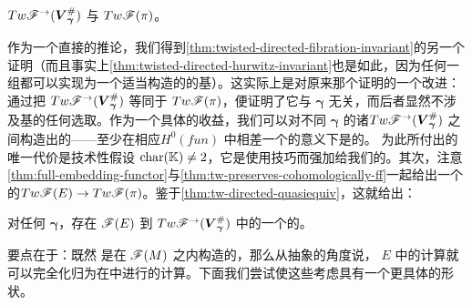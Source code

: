 \begin{theorem}\label{thm:tw-directed-quasiequiv}
$Tw\mathscr{F}^{\rightarrow}(\boldsymbol{V}^{\#}_{\boldsymbol{\gamma}})$ 与 $Tw\mathscr{F}(\pi)$\trQuasiequivalent{}。
\end{theorem}
\noqed
作为一个直接的推论，我们得到\cref{thm:twisted-directed-fibration-invariant}的另一个证明（而且事实上\cref{thm:twisted-directed-hurwitz-invariant}也是如此，因为任何一组\trLagrange\trSphere{}都可以实现为一个适当构造的\trLefschetzFibration{}的\trVanishingCycle{}基）。这实际上是对原来那个证明的一个改进：通过把 $Tw\mathscr{F}^{\rightarrow}(\boldsymbol{V}^{\#}_{\boldsymbol{\gamma}})$ 等同于 $Tw\mathscr{F}(\pi)$，便证明了它与 $\boldsymbol{\gamma}$ 无关，而后者显然不涉及基的任何选取。作为一个具体的收益，我们可以对不同 $\boldsymbol{\gamma}$ 的诸\trCategory{}$Tw\mathscr{F}^{\rightarrow}(\boldsymbol{V}^{\#}_{\boldsymbol{\gamma}})$ 之间构造出\trCanonical{}的\trQuasiequivalence——至少在相应\trFunctor{}\trCategory{}$H^{0}(fun)$ 中相差一个\trIsomorphism{}的意义下是\trCanonical{}的。
为此所付出的唯一代价是技术性假设 $\mathrm{char}(\mathbb{K})\neq 2$，它是使用\trDoubleBranchedCover{}技巧而强加给我们的。其次，注意\cref{thm:full-embedding-functor}与\cref{thm:tw-preserves-cohomologically-ff}一起给出一个\trCohomology{}\trFullyFaithful{}的\trFunctor{}$Tw\mathscr{F}(E)\to Tw\mathscr{F}(\pi)$。鉴于\cref{thm:tw-directed-quasiequiv}，这就给出：
\begin{corollary}\label{thm:directed-fukaya-ff-embedding}
对任何 $\boldsymbol{\gamma}$，存在 $\mathscr{F}(E)$ 到 $Tw\mathscr{F}^{\rightarrow}(\boldsymbol{V}^{\#}_{\boldsymbol{\gamma}})$ 中的一个\trCohomology{}\trFullyFaithful{}的\trEmbedding。
\end{corollary}
\noqed
要点在于：既然\trDirected{} \trFukayaCategory{}是在 $\mathscr{F}(M)$ 之内构造的，那么从抽象的角度说，\trTotalSpace{} $E$ 中的\trFloerCohomology{}计算就可以完全化归为在\trFiber{}中进行的计算。下面我们尝试使这些考虑具有一个更具体的形状。
